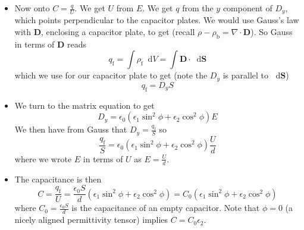 \documentclass[11pt, a4paper]{article}
\newcommand{\diff}{\mathop{}\!\mathrm{d}} %
\renewcommand{\vec}[1]{\bm{#1}} %
\newcommand{\D}{\vec{D}}  %
\newcommand{\e}{\epsilon}
\newcommand{\ee}{\epsilon_{0}}  %
\renewcommand{\div}{\nabla \cdot}
\begin{document}
\begin{itemize}
	\item Now onto $ C = \frac{q}{U} $. We get $ U $ from $ E $. We get $ q $ from the $ y $ component of $ D_{y} $, which points perpendicular to the capacitor plates. We would use Gauss's law with $ \D $, enclosing a capacitor plate, to get (recall $ \rho - \rho_{\text{b}} = \div \D $). So Gauss in terms of $ \D $ reads
	\begin{equation*}
		q_{\text{f}} = \int \rho_{\text{f}} \diff V = \int \D \cdot \diff \vec{S}
	\end{equation*}
	which we use for our capacitor plate to get (note the $ D_{y} $ is parallel to $ \diff \vec{S} $)
	\begin{equation*}
		q_{\text{f}} = D_{y} S
	\end{equation*}
	
	\item We turn to the matrix equation to get
	\begin{equation*}
		D_{y} = \ee \left( \e_{1} \sin^{2}\phi + \e_{2} \cos^{2}\phi \right) E
	\end{equation*}
	We then have from Gauss that $ D_{y} = \frac{q_{\text{f}}}{S} $ so 
	\begin{equation*}
		\frac{q_{\text{f}}}{S} =  \ee \left( \e_{1} \sin^{2}\phi + \e_{2} \cos^{2}\phi \right) \frac{U}{d} 
	\end{equation*}
	where we wrote $ E $ in terms of $ U $ as $ E = \frac{U}{d} $.
	
	\item The capacitance is then
	\begin{equation*}
		C = \frac{q_{\text{f}}}{U} = \frac{\ee S}{d}\left(\e_{1} \sin^{2}\phi + \e_{2} \cos^{2}\phi\right) = C_{0}\left(\e_{1} \sin^{2}\phi + \e_{2} \cos^{2}\phi\right)
	\end{equation*}
	where $ C_{0} =  \frac{\ee S}{d} $ is the capacitance of an empty capacitor. Note that $ \phi = 0 $ (a nicely aligned permittivity tensor) implies $ C = C_{0}\e_{2} $. 
\end{itemize}
\end{document}
